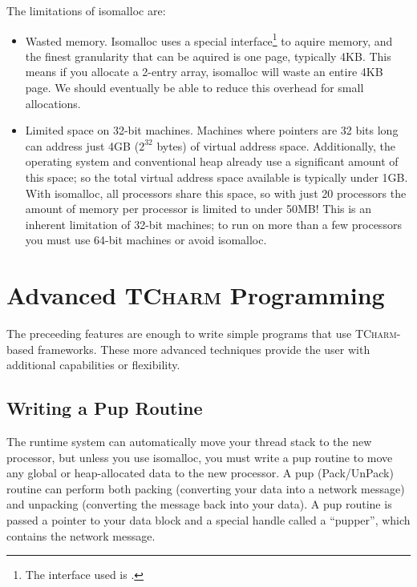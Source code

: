 \documentclass[10pt]{article}
\newcommand{\tcharm}{\textsc{TCharm}}
\begin{document}
The limitations of isomalloc are:
\begin{itemize}
\item Wasted memory.  Isomalloc uses a special interface\footnote{
The interface used is .} to aquire memory, and the finest granularity
that can be aquired is one page, typically 4KB.  This means if you allocate
a 2-entry array, isomalloc will waste an entire 4KB page.  We should eventually 
be able to reduce this overhead for small allocations.

\item Limited space on 32-bit machines.  Machines where pointers are 32 bits
long can address just 4GB ($2^32$ bytes) of virtual address space.  Additionally, 
the operating system and conventional heap already use a significant amount 
of this space; so the total virtual address space available is typically under 1GB.  
With isomalloc, all processors share this space, so with just 20 processors
the amount of memory per processor is limited to under 50MB!  This is an 
inherent limitation of 32-bit machines; to run on more than a few processors you 
must use 64-bit machines or avoid isomalloc.
\end{itemize}



\section{Advanced \tcharm{} Programming}
The preceeding features are enough to write simple programs
that use \tcharm{}-based frameworks.  These more advanced techniques
provide the user with additional capabilities or flexibility.


\subsection{Writing a Pup Routine}
\label{sec:pup}

The runtime system can automatically move your thread stack to the new
processor, but unless you use isomalloc, you must write a pup routine to 
move any global or heap-allocated data to the new processor.  A pup
(Pack/UnPack) routine can perform both packing (converting your data into a
network message) and unpacking (converting the message back into your data).  
A pup routine is passed a pointer to your data block and a
special handle called a ``pupper'', which contains the network message.  
\end{document}
